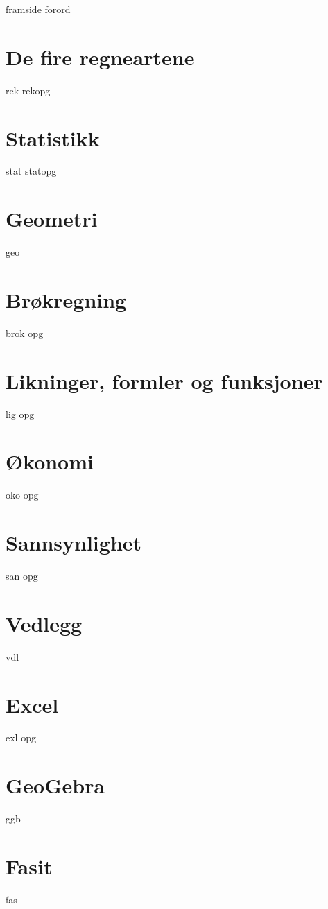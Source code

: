 




{framside}
{forord}

\tableofcontents
\chapter{De fire regneartene}
\newpage
{rek}
{rekopg}

\chapter{Statistikk}
\newpage
{stat}
{statopg}


\chapter{Geometri}
{geo}

\chapter{Brøkregning \label{Br}}
\newpage
{brok}
\newpage
{opg}

\chapter{Likninger, formler og funksjoner \label{Lig}}
{lig}
{opg}


\chapter{Økonomi \label{Oko}}
{oko}
{opg}

\chapter{Sannsynlighet \label{San}} 
{san}
{opg}
\newpage


\chapter*{Vedlegg} 
{vdl}

\chapter*{Excel} 
{exl}	
\newpage
{opg}	


\chapter*{GeoGebra} 
{ggb}	

\chapter*{Fasit}
{fas}






